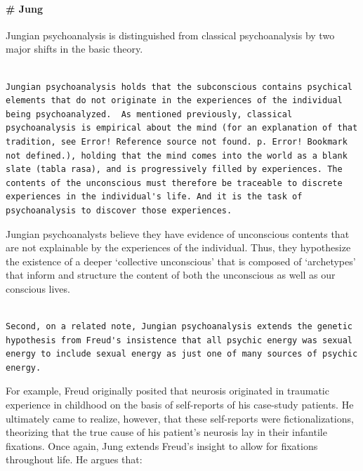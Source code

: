 \paragraph{\# Jung}
\label{jung}

Jungian psychoanalysis is distinguished from classical psychoanalysis by two major shifts in the basic theory.

\begin{adjustwidth}{2.5em}{2.5em}
\begin{verbatim}

Jungian psychoanalysis holds that the subconscious contains psychical elements that do not originate in the experiences of the individual being psychoanalyzed.  As mentioned previously, classical psychoanalysis is empirical about the mind (for an explanation of that tradition, see Error! Reference source not found. p. Error! Bookmark not defined.), holding that the mind comes into the world as a blank slate (tabla rasa), and is progressively filled by experiences. The contents of the unconscious must therefore be traceable to discrete experiences in the individual's life. And it is the task of psychoanalysis to discover those experiences.  

\end{verbatim}
\end{adjustwidth}

Jungian psychoanalysts believe they have evidence of unconscious contents that are not explainable by the experiences of the individual. Thus, they hypothesize the existence of a deeper `collective unconscious' that is composed of `archetypes' that inform and structure the content of both the unconscious as well as our conscious lives.

\begin{adjustwidth}{2.5em}{2.5em}
\begin{verbatim}

Second, on a related note, Jungian psychoanalysis extends the genetic hypothesis from Freud's insistence that all psychic energy was sexual energy to include sexual energy as just one of many sources of psychic energy.

\end{verbatim}
\end{adjustwidth}

For example, Freud originally posited that neurosis originated in traumatic experience in childhood on the basis of self-reports of his case-study patients. He ultimately came to realize, however, that these self-reports were fictionalizations, theorizing that the true cause of his patient's neurosis lay in their infantile fixations. Once again, Jung extends Freud's insight to allow for fixations throughout life. He argues that:

